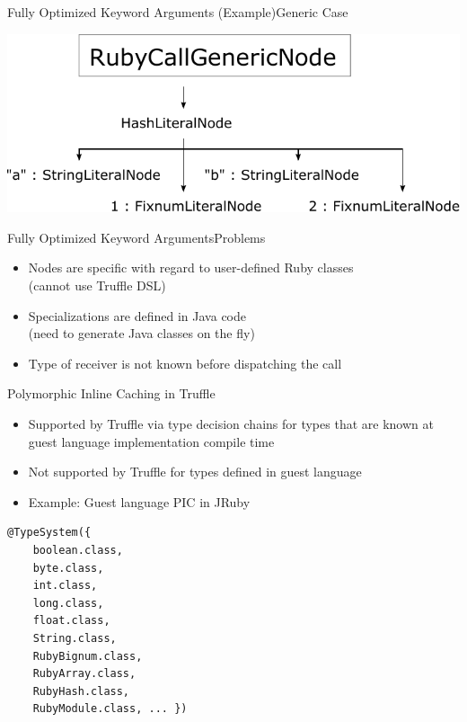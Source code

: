 \documentclass[xcolor=dvipsname,handout]{beamer} %
\begin{document}
\begin{frame}{Fully Optimized Keyword Arguments (Example)}{Generic Case}
\begin{table}
    \centering
    \includegraphics[width=\textwidth]{kwargs_generic.pdf}
\end{table}
\end{frame}

\begin{frame}{Fully Optimized Keyword Arguments}{Problems}
\begin{itemize}
    \item Nodes are specific with regard to user-defined Ruby classes \\ (cannot use Truffle DSL)
    \item Specializations are defined in Java code \\ (need to generate Java classes on the fly)
    \item Type of receiver is not known before dispatching the call
\end{itemize}
\end{frame}

\begin{frame}[fragile]{Polymorphic Inline Caching in Truffle}
\begin{itemize}
    \item Supported by Truffle via type decision chains for types that are known at guest language implementation compile time
    \item Not supported by Truffle for types defined in guest language
    \item Example: Guest language PIC in JRuby
\end{itemize}

\begin{table}
\begin{lstlisting}
@TypeSystem({
    boolean.class, 
    byte.class, 
    int.class, 
    long.class, 
    float.class, 
    String.class,
    RubyBignum.class, 
    RubyArray.class, 
    RubyHash.class,
    RubyModule.class, ... }) 
\end{lstlisting}
\end{table}
\end{frame}
\end{document}
